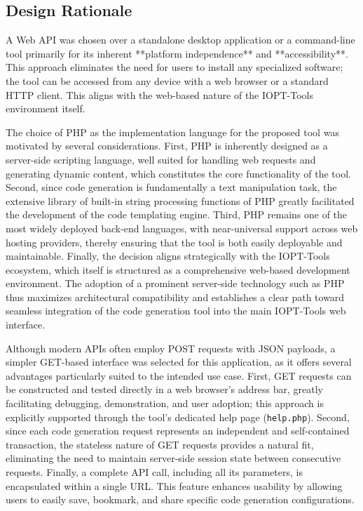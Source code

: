 
\subsection{Design Rationale}
\label{subsec:design_rationale}

A Web API was chosen over a standalone desktop application or a command-line tool primarily for its inherent **platform independence** and **accessibility**. This approach eliminates the need for users to install any specialized software; the tool can be accessed from any device with a web browser or a standard HTTP client. This aligns with the web-based nature of the IOPT-Tools environment itself.

The choice of PHP as the implementation language for the proposed tool was motivated by several considerations. First, PHP is inherently designed as a server-side scripting language, well suited for handling web requests and generating dynamic content, which constitutes the core functionality of the tool. Second, since code generation is fundamentally a text manipulation task, the extensive library of built-in string processing functions of PHP greatly facilitated the development of the code templating engine. Third, PHP remains one of the most widely deployed back-end languages, with near-universal support across web hosting providers, thereby ensuring that the tool is both easily deployable and maintainable. Finally, the decision aligns strategically with the IOPT-Tools ecosystem, which itself is structured as a comprehensive web-based development environment. The adoption of a prominent server-side technology such as PHP thus maximizes architectural compatibility and establishes a clear path toward seamless integration of the code generation tool into the main IOPT-Tools web interface.

Although modern APIs often employ POST requests with JSON payloads, a simpler GET-based interface was selected for this application, as it offers several advantages particularly suited to the intended use case. First, GET requests can be constructed and tested directly in a web browser's address bar, greatly facilitating debugging, demonstration, and user adoption; this approach is explicitly supported through the tool’s dedicated help page (\texttt{help.php}). Second, since each code generation request represents an independent and self-contained transaction, the stateless nature of GET requests provides a natural fit, eliminating the need to maintain server-side session state between consecutive requests. Finally, a complete API call, including all its parameters, is encapsulated within a single URL. This feature enhances usability by allowing users to easily save, bookmark, and share specific code generation configurations.


